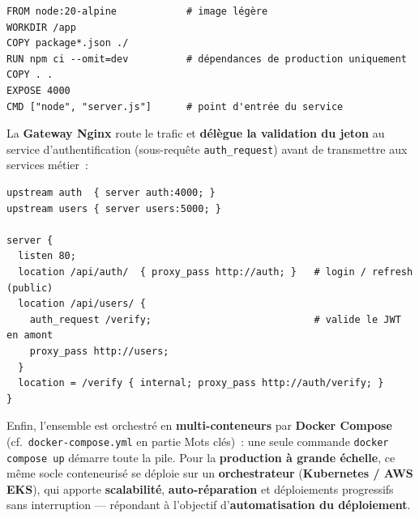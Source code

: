 \begin{verbatim}
FROM node:20-alpine            # image légère
WORKDIR /app
COPY package*.json ./
RUN npm ci --omit=dev          # dépendances de production uniquement
COPY . .
EXPOSE 4000
CMD ["node", "server.js"]      # point d'entrée du service
\end{verbatim}

\noindent La \textbf{Gateway Nginx} route le trafic et \textbf{délègue la validation du jeton} au service d'authentification (sous-requête \texttt{auth\_request}) avant de transmettre aux services métier~:

\begin{verbatim}
upstream auth  { server auth:4000; }
upstream users { server users:5000; }

server {
  listen 80;
  location /api/auth/  { proxy_pass http://auth; }   # login / refresh (public)
  location /api/users/ {
    auth_request /verify;                            # valide le JWT en amont
    proxy_pass http://users;
  }
  location = /verify { internal; proxy_pass http://auth/verify; }
}
\end{verbatim}

\noindent Enfin, l'ensemble est orchestré en \textbf{multi-conteneurs} par \textbf{Docker Compose} (cf.~\texttt{docker-compose.yml} en partie \og{}Mots clés\fg{})~: une seule commande \texttt{docker compose up} démarre toute la pile. Pour la \textbf{production à grande échelle}, ce même socle conteneurisé se déploie sur un \textbf{orchestrateur} (\textbf{Kubernetes / AWS EKS}), qui apporte \textbf{scalabilité}, \textbf{auto-réparation} et déploiements progressifs sans interruption — répondant à l'objectif d'\textbf{automatisation du déploiement}.

\vspace{0.4cm}

